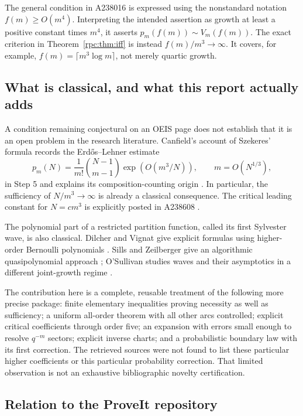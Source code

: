 \documentclass[11pt]{article}
\theoremstyle{definition}
\theoremstyle{remark}
\numberwithin{equation}{section}
\begin{document}
The general condition in A238016 is expressed using the nonstandard notation
$f(m)\ge O(m^4)$. Interpreting the intended assertion as growth at least a
positive constant times $m^4$, it asserts $p_m(f(m))\sim V_m(f(m))$.
The exact criterion in Theorem~\ref{rpc:thm:iff} is instead $f(m)/m^3\to\infty$.
It covers, for example, $f(m)=\lceil m^3\log m\rceil$, not merely quartic growth.

\subsection{What is classical, and what this report actually adds}

A condition remaining conjectural on an OEIS page does not establish that
it is an open problem in the research literature. Canfield's account of
Szekeres' formula records the Erd\H{o}s--Lehner estimate
\begin{equation}\label{rpc:eq:classical}
 p_m(N)=\frac1{m!}\binom{N-1}{m-1}
          \exp\!\left(O(m^3/N)\right),\qquad m=O(N^{1/3}),
\end{equation}
in Step 5 and explains its composition-counting origin
\cite[pp.~4, 9--10]{canfield}. In particular, the sufficiency of
$N/m^3\to\infty$ is already a classical consequence. The critical leading
constant for $N=c m^3$ is explicitly posted in A238608 \cite{oeis238608}.

The polynomial part of a restricted partition function, called its first
Sylvester wave, is also classical. Dilcher and Vignat give explicit formulas
using higher-order Bernoulli polynomials \cite{dilchervignat}. Sills and
Zeilberger give an algorithmic quasipolynomial approach \cite{sillszeilberger};
O'Sullivan studies waves and their asymptotics in a different joint-growth
regime \cite{osullivan}.

The contribution here is a complete, reusable treatment of the following
more precise package: finite elementary inequalities proving necessity as
well as sufficiency; a uniform all-order theorem with all other arcs controlled;
explicit critical coefficients through order five; an expansion with errors
small enough to resolve $q^{-m}$ sectors; explicit inverse charts; and a
probabilistic boundary law with its first correction. The retrieved sources
were not found to list these particular higher coefficients or this particular
probability correction. That limited observation is not an exhaustive
bibliographic novelty certification.

\subsection{Relation to the ProveIt repository}\label{rpc:sec:proveit}
\end{document}
